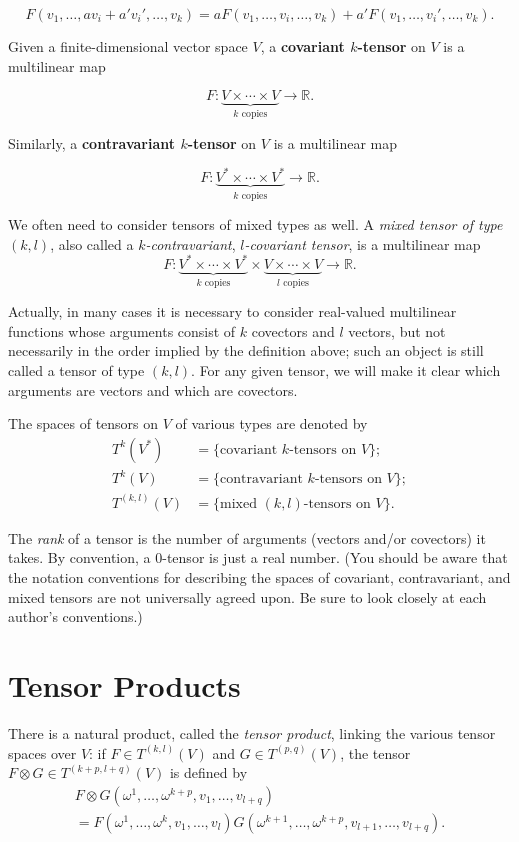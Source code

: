 \[
F(v_1,\ldots,av_i + a'v_i',\ldots,v_k) = aF(v_1,\ldots,v_i,\ldots,v_k) + a'F(v_1,\ldots,v_i',\ldots,v_k).
\]

Given a finite-dimensional vector space $V$, a \textbf{covariant $k$-tensor} on $V$ is a multilinear map

\[
F: \underbrace{V \times \cdots \times V}_{k \text{ copies}} \to \mathbb{R}.
\]

Similarly, a \textbf{contravariant $k$-tensor} on $V$ is a multilinear map

\[
F : \underbrace{V^* \times \cdots \times V^*}_{k \text{ copies}} \to \mathbb{R}.
\]

We often need to consider tensors of mixed types as well. A \emph{mixed tensor of type} $(k, l)$, also called a $k$\emph{-contravariant}, $l$\emph{-covariant tensor}, is a multilinear map
\[
F : \underbrace{V^* \times \cdots \times V^*}_{k \text{ copies}} \times \underbrace{V \times \cdots \times V}_{l \text{ copies}} \to \mathbb{R}.
\]

Actually, in many cases it is necessary to consider real-valued multilinear functions whose arguments consist of $k$ covectors and $l$ vectors, but not necessarily in the order implied by the definition above; such an object is still called a tensor of type $(k,l)$. For any given tensor, we will make it clear which arguments are vectors and which are covectors.

The spaces of tensors on $V$ of various types are denoted by
\begin{align*}
T^k(V^*) &= \{\text{covariant } k\text{-tensors on } V\}; \\
T^k(V) &= \{\text{contravariant } k\text{-tensors on } V\}; \\
T^{(k,l)}(V) &= \{\text{mixed } (k,l)\text{-tensors on } V\}.
\end{align*}

The \emph{rank} of a tensor is the number of arguments (vectors and/or covectors) it takes. By convention, a $0$-tensor is just a real number. (You should be aware that the notation conventions for describing the spaces of covariant, contravariant, and mixed tensors are not universally agreed upon. Be sure to look closely at each author's conventions.)

\section{Tensor Products}

There is a natural product, called the \emph{tensor product}, linking the various tensor spaces over $V$: if $F \in T^{(k,l)}(V)$ and $G \in T^{(p,q)}(V)$, the tensor $F \otimes G \in T^{(k+p,l+q)}(V)$ is defined by
\[
\begin{split}
F \otimes G(\omega^1, \ldots, \omega^{k+p}, v_1, \ldots, v_{l+q}) \\
= F(\omega^1, \ldots, \omega^k, v_1, \ldots, v_l) G(\omega^{k+1}, \ldots, \omega^{k+p}, v_{l+1}, \ldots, v_{l+q}).
\end{split}
\]

